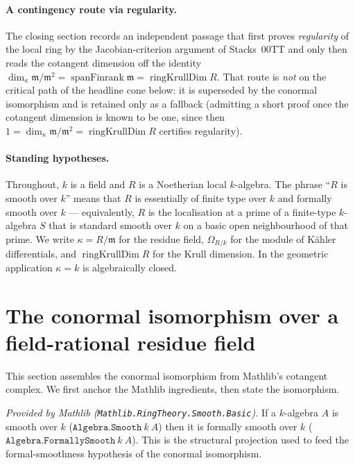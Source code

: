\paragraph{A contingency route via regularity.} The closing section records an
independent passage that first proves \emph{regularity} of the local ring by
the Jacobian-criterion argument of Stacks~00TT and only then reads the
cotangent dimension off the identity \(\dim_\kappa \mathfrak m/\mathfrak m^2 =
\operatorname{spanFinrank} \mathfrak m = \operatorname{ringKrullDim} R\). That
route is \emph{not} on the critical path of the headline cone below: it is
superseded by the conormal isomorphism and is retained only as a fallback
(admitting a short proof once the cotangent dimension is known to be one,
since then \(1 = \dim_\kappa \mathfrak m/\mathfrak m^2 =
\operatorname{ringKrullDim} R\) certifies regularity).

\paragraph{Standing hypotheses.} Throughout, \(k\) is a field and \(R\) is a
Noetherian local \(k\)-algebra. The phrase ``\(R\) is smooth over \(k\)''
means that \(R\) is essentially of finite type over \(k\) and formally smooth
over \(k\) --- equivalently, \(R\) is the localisation at a prime of a
finite-type \(k\)-algebra \(S\) that is standard smooth over \(k\) on a basic
open neighbourhood of that prime. We write \(\kappa = R / \mathfrak m\) for
the residue field, \(\Omega_{R/k}\) for the module of K\"ahler differentials,
and \(\operatorname{ringKrullDim} R\) for the Krull dimension. In the
geometric application \(\kappa = k\) is algebraically closed.

\section{The conormal isomorphism over a field-rational residue field}

This section assembles the conormal isomorphism from Mathlib's cotangent
complex. We first anchor the Mathlib ingredients, then state the
isomorphism.

\begin{lemma}
  \label{lem:smooth_formallySmooth}
  \mathlibok
  \textit{Provided by Mathlib
  (\texttt{Mathlib.RingTheory.Smooth.Basic}).}
  If a \(k\)-algebra \(A\) is smooth over \(k\) (\(\texttt{Algebra.Smooth}\
  k\ A\)) then it is formally smooth over \(k\)
  (\(\texttt{Algebra.FormallySmooth}\ k\ A\)). This is the structural
  projection used to feed the formal-smoothness hypothesis of the conormal
  isomorphism.
\end{lemma}

